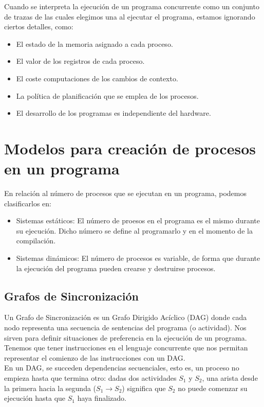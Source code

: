 \noindent
Cuando se interpreta la ejecución de un programa concurrente como un conjunto de trazas de las cuales elegimos una al ejecutar el programa, estamos ignorando ciertos detalles, como:
\begin{itemize}
    \item El estado de la memoria asignado a cada proceso.
    \item El valor de los registros de cada proceso.
    \item El coste computaciones de los cambios de contexto.
    \item La política de planificación que se emplea de los procesos.
    \item El desarrollo de los programas es independiente del hardware.
\end{itemize}

\section{Modelos para creación de procesos en un programa}
En relación al número de procesos que se ejecutan en un programa, podemos clasificarlos en:
\begin{itemize}
    \item Sistemas estáticos: El número de proesos en el programa es el mismo durante su ejecución. Dicho número se define al programarlo y en el momento de la compilación.
    \item Sistemas dinámicos: El número de procesos es variable, de forma que durante la ejecución del programa pueden crearse y destruirse procesos.
\end{itemize}

\subsection{Grafos de Sincronización}
Un Grafo de Sincronización es un Grafo Dirigido Acíclico (DAG) donde cada nodo representa una secuencia de sentencias del programa (o actividad). Nos sirven para definir situaciones de preferencia en la ejecución de un programa. Tenemos que tener instrucciones en el lenguaje concurrente que nos permitan representar el comienzo de las instrucciones con un DAG\@.\\

En un DAG, se succeden dependencias secuenciales, esto es, un proceso no empieza hasta que termina otro: dadas dos actividades $S_1$ y $S_2$, una arista desde la primera hacia la segunda ($S_1\rightarrow S_2$) significa que $S_2$ no puede comenzar su ejecución hasta que $S_1$ haya finalizado.\\

